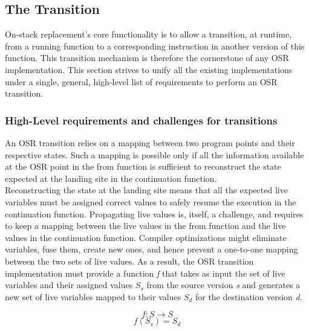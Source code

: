 \subsection{The Transition}
On-stack replacement's core functionality is to allow a transition, at runtime, from a running function to a corresponding instruction in another version of this function.
This transition mechanism is therefore the cornerstone of any OSR implementation.
This section strives to unify all the existing implementations under a single, general, high-level list of requirements to perform an OSR transition.

\subsubsection{High-Level requirements and challenges for transitions}\label{HLREQ}

An OSR transition relies on a mapping between two program points and their respective states.
Such a mapping is possible only if all the information available at the OSR point in the from function is sufficient to reconstruct the state expected at the landing site in the continuation function.\\

Reconstructing the state at the landing site means that all the expected live variables must be assigned  correct values to safely resume the execution in the continuation function.
Propagating live values is, itself, a challenge, and requires to keep a mapping between the live values in the from function and the live values in the continuation function.
Compiler optimizations might eliminate variables, fuse them, create new ones, and hence prevent a one-to-one mapping between the two sets of live values. 
As a result, the OSR transition implementation must provide a function \textit{f} that takes as input the set of live variables and their assigned values $S_s$ from the source version \textit{s} and generates a new set of live variables mapped to their values $S_d$ for the destination version \textit{d}.

\[f: S \rightarrow S\]
\[f(S_s) = S_d\]

